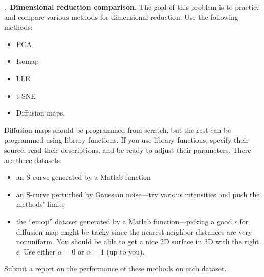 \documentclass{letter}
\newcounter{problem}
\newcommand{\Problem}[2]{%
	\stepcounter{problem}%
	\leftskip=0pt%
	\theproblem.~\textbf{{#1.}} #2 \par%
}
\begin{document}
    \Problem{Dimensional reduction comparison}{The goal of this problem is to practice and compare various methods for dimensional reduction. Use the following methods: \begin{itemize}
        \item PCA
        \item Isomap
        \item LLE
        \item t-SNE
        \item Diffusion maps.
    \end{itemize} Diffusion maps should be programmed from scratch, but the rest can be programmed using library functions. If you use library functions, specify their source, read their descriptions, and be ready to adjust their parameters. There are three datasets: \begin{itemize}
        \item an S-curve generated by a Matlab function
        \item an S-curve perturbed by Gaussian noise---try various intensities and push the methods' limits
        \item the ``emoji'' dataset generated by a Matlab function---picking a good $\epsilon$ for diffusion map might be tricky since the nearest neighbor distances are very nonuniform. You should be able to get a nice 2D surface in 3D with the right $\epsilon$. Use either $\alpha=0$ or $\alpha=1$ (up to you).
    \end{itemize} Submit a report on the performance of these methods on each dataset.}
\end{document}
